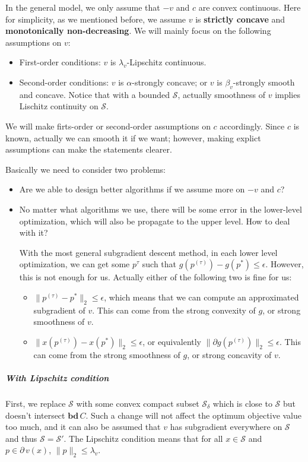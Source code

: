 \documentclass{article}
\begin{document}
In the general model, we only assume that $-v$ and $c$ are convex continuous. Here for simplicity, as we mentioned before, we assume $v$ is \textbf{strictly concave} and \textbf{monotonically non-decreasing}. We will mainly focus on the following assumptions on $v$:
\begin{itemize}
    \item First-order conditions: $v$ is $\lambda_v$-Lipschitz continuous.
    \item Second-order conditions: $v$ is $\alpha$-strongly concave; or $v$ is $\beta_v$-strongly smooth and concave. Notice that with a bounded $\mathcal{S}$, actually smoothness of $v$ implies Lischitz continuity on $\mathcal{S}$.
\end{itemize}
We will make firts-order or second-order assumptions on $c$ accordingly. Since $c$ is known, actually we can smooth it if we want; however, making explict assumptions can make the statements clearer.

Basically we need to consider two problems:
\begin{itemize}
    \item Are we able to design better algorithms if we assume more on $-v$ and $c$?
    \item No matter what algorithms we use, there will be some error in the lower-level optimization, which will also be propagate to the upper level. How to deal with it?

    With the most general subgradient descent method, in each lower level optimization, we can get some $p^{\tau}$ such that $g(p^{(\tau)})-g(p^*)\le\epsilon$. However, this is not enough for us. Actually either of the following two is fine for us:
    \begin{itemize}
        \item $\|p^{(\tau)}-p^*\|_2\le\epsilon$, which means that we can compute an approximated subgradient of $v$. This can come from the strong convexity of $g$, or strong smoothness of $v$.
        \item $\|x(p^{(\tau)})-x(p^*)\|_2\le\epsilon$, or equivalently $\|\partial g(p^{(\tau)})\|_2\le\epsilon$. This can come from the strong smoothness of $g$, or strong concavity of $v$.
    \end{itemize}
\end{itemize}

\subparagraph{With Lipschitz condition}
First, we replace $\mathcal{S}$ with some convex compact subset $\mathcal{S}_{\delta}$ which is close to $\mathcal{S}$ but doesn't intersect $\mathbf{bd}\,C$. Such a change will not affect the optimum objective value too much, and it can also be assumed that $v$ has subgradient everywhere on $\mathcal{S}$ and thus $\mathcal{S}=\mathcal{S}'$. The Lipschitz condition means that for all $x\in \mathcal{S}$ and $p\in\partial\,v(x)$, $\|p\|_2\le\lambda_v$.
\end{document}
